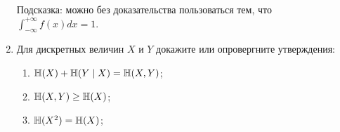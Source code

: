 \begin{enumerate}
Подсказка: можно без доказательства пользоваться тем, что $\int_{-\infty}^{+\infty} f(x) dx = 1$.

\item Для дискретных величин $X$ и $Y$ докажите или опровергните утверждения:
\begin{enumerate}
    \item $\operatorname{\mathbb{H}}(X) + \operatorname{\mathbb{H}}(Y \mid X) = \operatorname{\mathbb{H}}(X, Y)$;
    \item $\operatorname{\mathbb{H}}(X, Y) \geq \operatorname{\mathbb{H}}(X)$;
    \item $\operatorname{\mathbb{H}}(X^2) = \operatorname{\mathbb{H}}(X)$;
\end{enumerate}


\end{enumerate}


